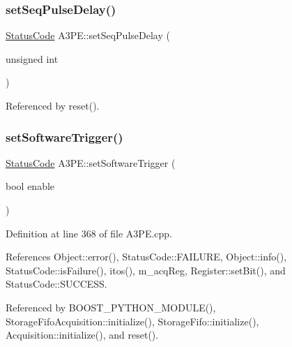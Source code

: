 \subsubsection{\texorpdfstring{set\+Seq\+Pulse\+Delay()}{setSeqPulseDelay()}}
{\footnotesize\ttfamily \hyperlink{classStatusCode}{Status\+Code} A3\+P\+E\+::set\+Seq\+Pulse\+Delay (\begin{DoxyParamCaption}\item[{unsigned}]{int }\end{DoxyParamCaption})}



Referenced by reset().

\mbox{\label{classA3PE_aac0ee532f78885a25eebddbad501417f}} 
\subsubsection{\texorpdfstring{set\+Software\+Trigger()}{setSoftwareTrigger()}}
{\footnotesize\ttfamily \hyperlink{classStatusCode}{Status\+Code} A3\+P\+E\+::set\+Software\+Trigger (\begin{DoxyParamCaption}\item[{bool}]{enable }\end{DoxyParamCaption})}



Definition at line 368 of file A3\+P\+E.\+cpp.



References Object\+::error(), Status\+Code\+::\+F\+A\+I\+L\+U\+RE, Object\+::info(), Status\+Code\+::is\+Failure(), itos(), m\+\_\+acq\+Reg, Register\+::set\+Bit(), and Status\+Code\+::\+S\+U\+C\+C\+E\+SS.



Referenced by B\+O\+O\+S\+T\+\_\+\+P\+Y\+T\+H\+O\+N\+\_\+\+M\+O\+D\+U\+L\+E(), Storage\+Fifo\+Acquisition\+::initialize(), Storage\+Fifo\+::initialize(), Acquisition\+::initialize(), and reset().


